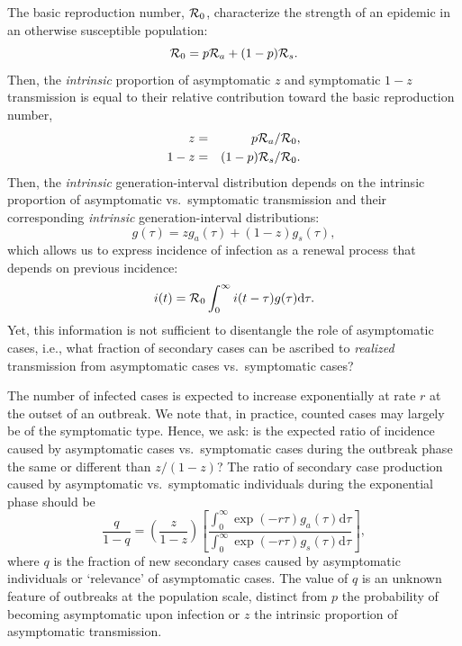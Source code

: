 The basic reproduction number, ${\cal{R}}_0$, characterize the strength of an epidemic in an otherwise susceptible population:
\begin{equation}
{\cal{R}}_{0}= p {\cal{R}}_a + (1-p) {\cal{R}}_s.
\end{equation}
Then, the \emph{intrinsic} proportion of asymptomatic $z$ and symptomatic $1-z$ transmission is equal to their relative contribution toward the basic reproduction number, 
\begin{eqnarray}
z &=& p {\cal{R}}_a/{\cal{R}}_{0},\\
1-z &=& (1-p) {\cal{R}}_s/{\cal{R}}_{0}.
\end{eqnarray}
Then, the \emph{intrinsic} generation-interval distribution depends on the intrinsic proportion of asymptomatic vs.~symptomatic transmission and their corresponding \emph{intrinsic} generation-interval distributions:
\begin{equation}
g(\tau) = z g_a(\tau) + (1-z) g_s(\tau),
\end{equation}
which allows us to express incidence of infection as a renewal process that depends on previous incidence:
\begin{equation}
i(t) = {\cal{R}}_{0} \int_0^\infty i(t-\tau) g(\tau) \mathrm{d} \tau.
\end{equation}
Yet, this information is not sufficient to disentangle the role of asymptomatic cases, i.e., what fraction of secondary cases can be ascribed to \emph{realized} transmission from asymptomatic cases vs.~symptomatic cases?

The number of infected cases is expected to increase exponentially at rate $r$ at the outset of an outbreak. We note that, in practice, counted cases may largely be of the symptomatic type. 
Hence, we ask: is the expected ratio of incidence caused by asymptomatic cases vs.~symptomatic cases during the outbreak phase the same or different than $z/(1-z)$?
The ratio of secondary case production caused by asymptomatic vs.~symptomatic individuals during the exponential phase should be
\begin{equation}
\frac{q}{1-q}=\left(\frac{z}{1-z}\right)\left[\frac{\int_0^\infty \exp(-r\tau) g_a(\tau) \mathrm{d}\tau}{\int_0^\infty \exp(-r\tau) g_s(\tau) \mathrm{d}\tau}\right],
\label{eq.qratio}
\end{equation}
where $q$ is the fraction of new secondary cases caused by asymptomatic individuals or `relevance' of asymptomatic cases. 
The value of $q$ is an unknown feature of outbreaks at the population scale, distinct from $p$ the probability of becoming asymptomatic upon infection or $z$ the intrinsic proportion of asymptomatic transmission.

